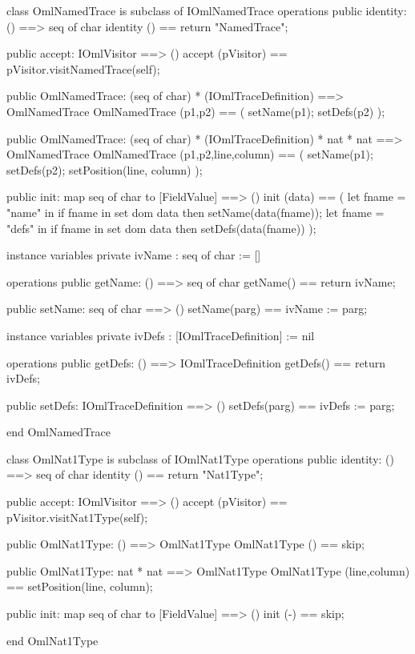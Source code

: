 \begin{vdm_al}
class OmlNamedTrace is subclass of IOmlNamedTrace
operations
  public identity: () ==> seq of char
  identity () == return "NamedTrace";

  public accept: IOmlVisitor ==> ()
  accept (pVisitor) == pVisitor.visitNamedTrace(self);

  public OmlNamedTrace:
    (seq of char) *
    (IOmlTraceDefinition) ==> OmlNamedTrace
  OmlNamedTrace (p1,p2) == 
    ( setName(p1);
      setDefs(p2) );

  public OmlNamedTrace:
    (seq of char) *
    (IOmlTraceDefinition) *
    nat *
    nat ==> OmlNamedTrace
  OmlNamedTrace (p1,p2,line,column) == 
    ( setName(p1);
      setDefs(p2);
      setPosition(line, column) );

  public init: map seq of char to [FieldValue] ==> ()
  init (data) ==
    ( let fname = "name" in
        if fname in set dom data
        then setName(data(fname));
      let fname = "defs" in
        if fname in set dom data
        then setDefs(data(fname)) );

instance variables
  private ivName : seq of char := []

operations
  public getName: () ==> seq of char
  getName() == return ivName;

  public setName: seq of char ==> ()
  setName(parg) == ivName := parg;

instance variables
  private ivDefs : [IOmlTraceDefinition] := nil

operations
  public getDefs: () ==> IOmlTraceDefinition
  getDefs() == return ivDefs;

  public setDefs: IOmlTraceDefinition ==> ()
  setDefs(parg) == ivDefs := parg;

end OmlNamedTrace
\end{vdm_al}

\begin{vdm_al}
class OmlNat1Type is subclass of IOmlNat1Type
operations
  public identity: () ==> seq of char
  identity () == return "Nat1Type";

  public accept: IOmlVisitor ==> ()
  accept (pVisitor) == pVisitor.visitNat1Type(self);

  public OmlNat1Type:
    () ==> OmlNat1Type
  OmlNat1Type () == 
    skip;

  public OmlNat1Type:
    nat *
    nat ==> OmlNat1Type
  OmlNat1Type (line,column) == 
    setPosition(line, column);

  public init: map seq of char to [FieldValue] ==> ()
  init (-) == skip;

end OmlNat1Type
\end{vdm_al}

